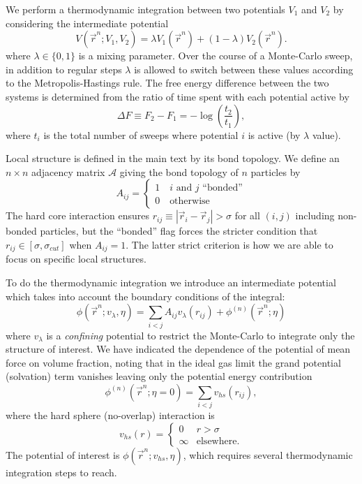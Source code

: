 \documentclass[11pt,twoside]{report}
\begin{document}
We perform a thermodynamic integration between two potentials $V_1$ and $V_2$ by considering the intermediate potential
\begin{equation}
  V(\vec{r}^n; V_1, V_2) = \lambda V_1(\vec{r}^n) + (1-\lambda) V_2(\vec{r}^n).
\end{equation}
where $\lambda \in \{0,1\}$ is a mixing parameter.
Over the course of a Monte-Carlo sweep, in addition to regular steps $\lambda$ is allowed to switch between these values according to the Metropolis-Hastings rule.
The free energy difference between the two systems is determined from the ratio of time spent with each potential active by
\begin{equation}
  \Delta F \equiv F_2 - F_1 = -\log{\left( \frac{t_2}{t_1} \right)},
\end{equation}
where $t_i$ is the total number of sweeps where potential $i$ is active (by $\lambda$ value).

Local structure is defined in the main text by its bond topology.
We define an $n \times n$ adjacency matrix $\mathcal{A}$ giving the bond topology of $n$ particles by
\begin{equation}
  A_{ij} =
  \begin{cases}
  1 \quad i \textrm{ and } j \textrm{ ``bonded''} \\
  0 \quad \textrm{otherwise}
  \end{cases}
\end{equation}
The hard core interaction ensures $r_{ij} \equiv |\vec{r}_i - \vec{r}_j| > \sigma$ for all $(i,j)$ including non-bonded particles, but the ``bonded'' flag forces the stricter condition that $r_{ij} \in [\sigma, \sigma_{cut}]$ when $A_{ij} = 1$.
The latter strict criterion is how we are able to focus on specific local structures.

To do the thermodynamic integration we introduce an intermediate potential which takes into account the boundary conditions of the integral:
\begin{equation}
  \phi(\vec{r}^n; v_\lambda, \eta) =
  \sum_{i < j} A_{ij} v_\lambda(r_{ij})
  + \phi^{(n)}(\vec{r}^n; \eta)
\end{equation}
where $v_\lambda$ is a \emph{confining} potential to restrict the Monte-Carlo to integrate only the structure of interest.
We have indicated the dependence of the potential of mean force on volume fraction, noting that in the ideal gas limit the grand potential (solvation) term vanishes leaving only the potential energy contribution
\begin{equation}
  \phi^{(n)}(\vec{r}^n; \eta=0) = \sum_{i < j} v_{hs}(r_{ij}),
\end{equation}
where the hard sphere (no-overlap) interaction is
\begin{equation}
  v_{hs}(r) =
  \begin{cases}
    0 &r > \sigma \\
    \infty &\textrm{elsewhere}.
  \end{cases}
\end{equation}
The potential of interest is $\phi(\vec{r}^n; v_{hs}, \eta)$, which requires several thermodynamic integration steps to reach.
\end{document}
